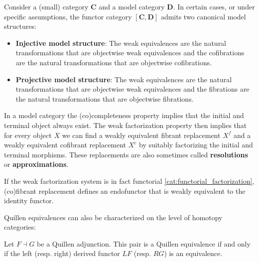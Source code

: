     \begin{property}\label{cat:model_functor}
        Consider a (small) category $\mathbf{C}$ and a model category $\mathbf{D}$. In certain cases, or under specific assumptions, the functor category $[\mathbf{C},\mathbf{D}]$ admits two canonical model structures:
        \begin{itemize}
            \item \textbf{Injective model structure}: The weak equivalences are the natural transformations that are objectwise weak equivalences and the cofibrations are the natural transformations that are objectwise cofibrations.
            \item \textbf{Projective model structure}: The weak equivalences are the natural transformations that are objectwise weak equivalences and the fibrations are the natural transformations that are objectwise fibrations.
        \end{itemize}
    \end{property}

    \begin{property}[Resolution]
        In a model category the (co)completeness property implies that the initial and terminal object always exist. The weak factorization property then implies that for every object $X$ we can find a weakly equivalent fibrant replacement $X^f$ and a weakly equivalent cofibrant replacement $X^c$ by suitably factorizing the initial and terminal morphisms. These replacements are also sometimes called \textbf{resolutions} or \textbf{approximations}.

        If the weak factorization system is in fact functorial \ref{cat:functorial_factorization}, (co)fibrant replacement defines an endofunctor that is weakly equivalent to the identity functor.
    \end{property}

    Quillen equivalences can also be characterized on the level of homotopy categories:
    \begin{property}
        Let $F\dashv G$ be a Quillen adjunction. This pair is a Quillen equivalence if and only if the left (resp. right) derived functor $LF$ (resp. $RG$) is an equivalence.
    \end{property}

